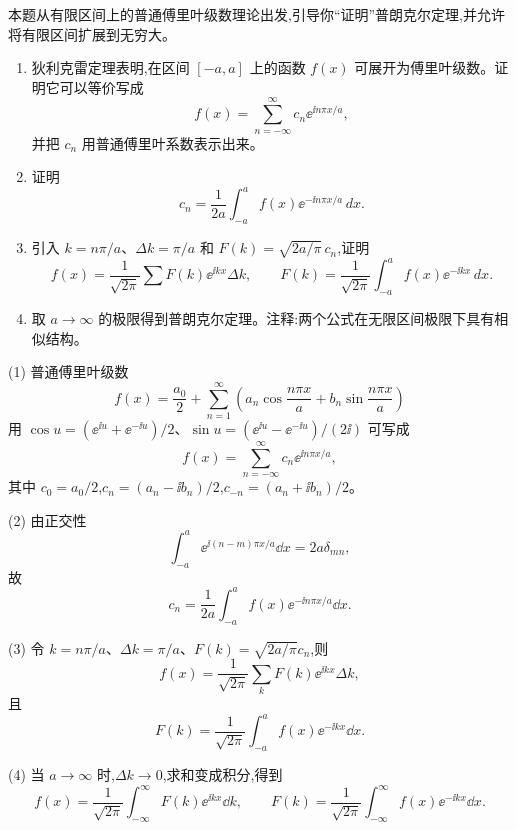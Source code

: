 \begin{question}
本题从有限区间上的普通傅里叶级数理论出发,引导你“证明”普朗克尔定理,并允许将有限区间扩展到无穷大。
\begin{enumerate}
\item 狄利克雷定理表明,在区间 $[-a,a]$ 上的函数 $f(x)$ 可展开为傅里叶级数。证明它可以等价写成
\[
f(x)=\sum_{n=-\infty}^{\infty}c_n \ee^{\ii n\pi x/a},
\]
并把 $c_n$ 用普通傅里叶系数表示出来。
\item 证明
\[
c_n=\frac{1}{2a}\int_{-a}^{a}f(x)\ee^{-\ii n\pi x/a}\,dx .
\]
\item 引入 $k=n\pi/a$、$\Delta k=\pi/a$ 和 $F(k)=\sqrt{2a/\pi}\,c_n$,证明
\[
f(x)=\frac{1}{\sqrt{2\pi}}\sum F(k)\ee^{\ii kx}\Delta k,
\qquad
F(k)=\frac{1}{\sqrt{2\pi}}\int_{-a}^{a}f(x)\ee^{-\ii kx}\,dx .
\]
\item 取 $a\to\infty$ 的极限得到普朗克尔定理。注释:两个公式在无限区间极限下具有相似结构。
\end{enumerate}
\begin{solution}
(1) 普通傅里叶级数
\[
f(x)=\frac{a_0}{2}+\sum_{n=1}^\infty\left(a_n\cos\frac{n\pi x}{a}+b_n\sin\frac{n\pi x}{a}\right)
\]
用 $\cos u=(\ee^{\ii u}+\ee^{-\ii u})/2$、$\sin u=(\ee^{\ii u}-\ee^{-\ii u})/(2\ii)$ 可写成
\[
f(x)=\sum_{n=-\infty}^{\infty}c_n\ee^{\ii n\pi x/a},
\]
其中 $c_0=a_0/2$,$c_n=(a_n-\ii b_n)/2$,$c_{-n}=(a_n+\ii b_n)/2$。

(2) 由正交性
\[
\int_{-a}^{a}\ee^{\ii(n-m)\pi x/a}\dd x=2a\delta_{mn},
\]
故
\[
c_n=\frac1{2a}\int_{-a}^{a}f(x)\ee^{-\ii n\pi x/a}\dd x.
\]

(3) 令 $k=n\pi/a$、$\Delta k=\pi/a$、$F(k)=\sqrt{2a/\pi}c_n$,则
\[
f(x)=\frac1{\sqrt{2\pi}}\sum_k F(k)\ee^{\ii kx}\Delta k,
\]
且
\[
F(k)=\frac1{\sqrt{2\pi}}\int_{-a}^{a}f(x)\ee^{-\ii kx}\dd x.
\]

(4) 当 $a\to\infty$ 时,$\Delta k\to0$,求和变成积分,得到
\[
f(x)=\frac1{\sqrt{2\pi}}\int_{-\infty}^{\infty}F(k)\ee^{\ii kx}\dd k,
\qquad
F(k)=\frac1{\sqrt{2\pi}}\int_{-\infty}^{\infty}f(x)\ee^{-\ii kx}\dd x.
\]
\end{solution}
\end{question}

